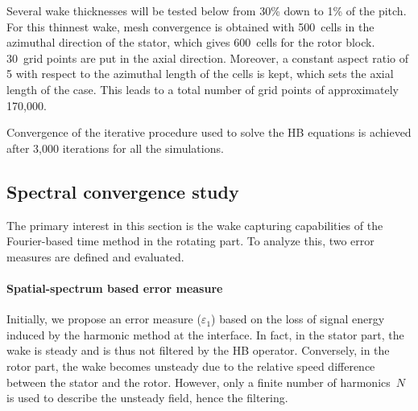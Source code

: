 Several wake thicknesses will be tested below
from 30\% down to 1\% of the pitch. For this thinnest wake, 
mesh convergence
is obtained with 500~cells in the azimuthal direction of
the stator, which gives
600~cells for the rotor block.
30~grid points are put in the axial direction. Moreover, a constant
aspect ratio of 5 with respect to the azimuthal length of the cells is
kept, which sets the axial length of the case.
This leads to a total number of grid points of approximately 
170,000. 

Convergence of the iterative procedure used to solve the HB equations is achieved 
after 3,000 iterations for 
all the simulations. 

\subsection{Spectral convergence study}
The primary interest in this section is the wake capturing capabilities of the 
Fourier-based time method in the rotating part. 
To analyze this, two error measures are defined and
evaluated. 

\paragraph{Spatial-spectrum based error measure}
\label{sec:crit_1}
Initially, we propose an error measure ($\varepsilon_1$) based 
on the loss of signal energy
induced by the harmonic method at the interface. 
In fact, in the stator part, the wake is steady and is thus not
filtered by the HB operator. 
Conversely, in the rotor part, the wake becomes
unsteady due to the relative speed difference between the
stator and the rotor. However, only a finite number of harmonics~$N$
is used to describe the unsteady field, hence the filtering.

